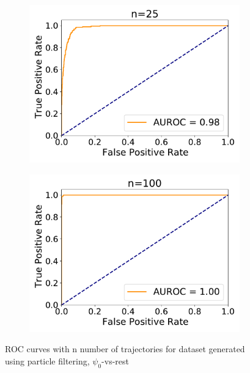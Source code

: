 \begin{figure}[H]
\begin{subfigure}{.33\textwidth}
		\includegraphics[width=1\linewidth]{figures/roc_analysis/roc_particleFilter/AUROC_2000samples_class0_llh_n25}
		\caption{}
		\label{fig:roc_part_n25}
	\end{subfigure}
	\begin{subfigure}{.33\textwidth}
		\centering
		\includegraphics[width=1\linewidth]{figures/roc_analysis/roc_particleFilter/AUROC_2000samples_class0_llh_n100}
		\caption{}
		\label{fig:roc_part_n100}
	\end{subfigure}
	\caption{ROC curves with n number of trajectories for dataset generated using particle filtering, $ \psi_0 $-vs-rest}
	\label{fig:roc_part}
\end{figure}